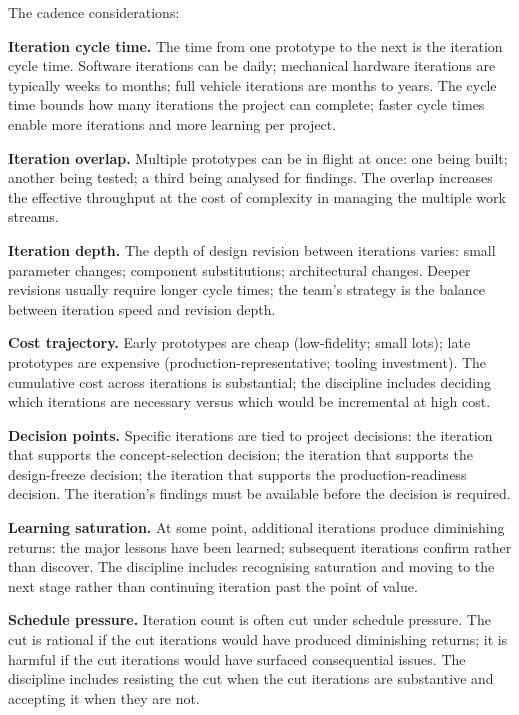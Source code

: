 The cadence considerations:

\textbf{Iteration cycle time.} The time from one prototype to the next is the iteration cycle time. Software iterations can be daily; mechanical hardware iterations are typically weeks to months; full vehicle iterations are months to years. The cycle time bounds how many iterations the project can complete; faster cycle times enable more iterations and more learning per project.

\textbf{Iteration overlap.} Multiple prototypes can be in flight at once: one being built; another being tested; a third being analysed for findings. The overlap increases the effective throughput at the cost of complexity in managing the multiple work streams.

\textbf{Iteration depth.} The depth of design revision between iterations varies: small parameter changes; component substitutions; architectural changes. Deeper revisions usually require longer cycle times; the team's strategy is the balance between iteration speed and revision depth.

\textbf{Cost trajectory.} Early prototypes are cheap (low-fidelity; small lots); late prototypes are expensive (production-representative; tooling investment). The cumulative cost across iterations is substantial; the discipline includes deciding which iterations are necessary versus which would be incremental at high cost.

\textbf{Decision points.} Specific iterations are tied to project decisions: the iteration that supports the concept-selection decision; the iteration that supports the design-freeze decision; the iteration that supports the production-readiness decision. The iteration's findings must be available before the decision is required.

\textbf{Learning saturation.} At some point, additional iterations produce diminishing returns: the major lessons have been learned; subsequent iterations confirm rather than discover. The discipline includes recognising saturation and moving to the next stage rather than continuing iteration past the point of value.

\textbf{Schedule pressure.} Iteration count is often cut under schedule pressure. The cut is rational if the cut iterations would have produced diminishing returns; it is harmful if the cut iterations would have surfaced consequential issues. The discipline includes resisting the cut when the cut iterations are substantive and accepting it when they are not.

